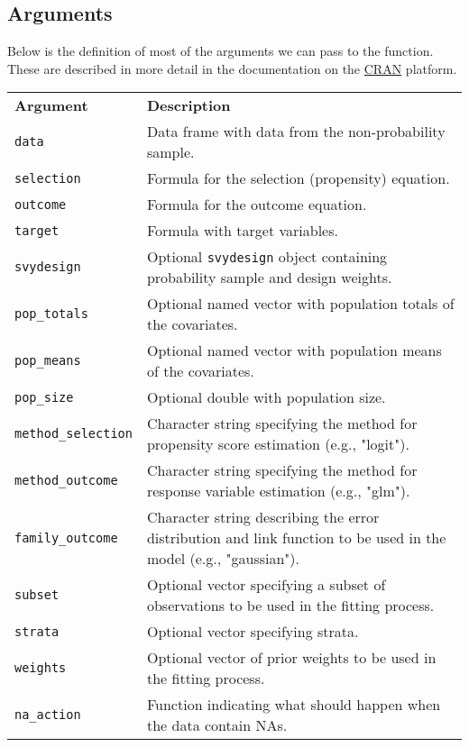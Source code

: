 \documentclass[
]{jss}
\begin{document}
\hypertarget{arguments}{%
\subsection{Arguments}\label{arguments}}

Below is the definition of most of the arguments we can pass to the
function. These are described in more detail in the documentation on the
\href{https://CRAN.R-project.org/package=nonprobsvy}{CRAN} platform.

\begin{longtable}{>{\ttfamily}p{5cm}p{10.5cm}}
    \textbf{Argument} & \textbf{Description} \\
    \texttt{data} & Data frame with data from the non-probability sample. \\
    \texttt{selection} & Formula for the selection (propensity) equation. \\
    \texttt{outcome} & Formula for the outcome equation. \\
    \texttt{target} & Formula with target variables. \\
    \texttt{svydesign} & Optional \texttt{svydesign} object containing probability sample and design weights. \\
    \texttt{pop\_totals} & Optional named vector with population totals of the covariates. \\
    \texttt{pop\_means} & Optional named vector with population means of the covariates. \\
    \texttt{pop\_size} & Optional double with population size. \\
    \texttt{method\_selection} & Character string specifying the method for propensity score estimation (e.g., "logit"). \\
    \texttt{method\_outcome} & Character string specifying the method for response variable estimation (e.g., "glm"). \\
    \texttt{family\_outcome} & Character string describing the error distribution and link function to be used in the model (e.g., "gaussian"). \\
    \texttt{subset} & Optional vector specifying a subset of observations to be used in the fitting process. \\
    \texttt{strata} & Optional vector specifying strata. \\
    \texttt{weights} & Optional vector of prior weights to be used in the fitting process. \\
    \texttt{na\_action} & Function indicating what should happen when the data contain NAs. \\

\end{longtable}
\end{document}
